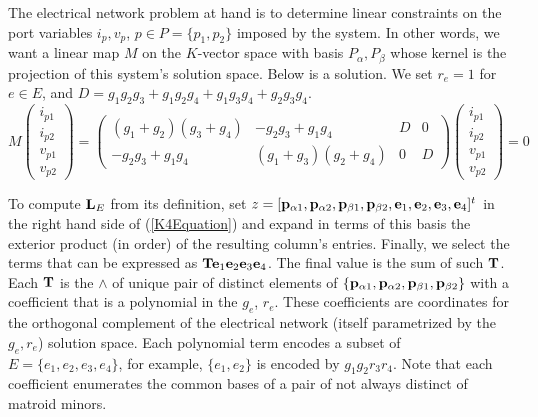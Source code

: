 The electrical network problem at hand is to determine linear constraints on the
port variables $i_p, v_p$, $p\in P = \{p_1, p_2\}$ imposed by the system.  In other words,
we want a linear map $M$ on the $K$-vector space with basis $P_\alpha, P_\beta$ whose kernel
is the projection of this system's solution space.
Below is a solution.
We set $r_e=1$ for $e\in E$, and $D=g_{1} g_{2} g_{3} + g_{1} g_{2} g_{4} + g_{1} g_{3} g_{4} + g_{2} g_{3} g_{4}$.
\begin{equation}\label{K4Soln}
M\left(\begin{array}{c} i_{p1} \\ i_{p2} \\ v_{p1} \\ v_{p2}
\end{array}\right) =
\left(\begin{array}{cccc}
{\left(g_{1} + g_{2}\right)} {\left(g_{3} + g_{4}\right)} & -g_{2} g_{3} + g_{1} g_{4} & D & 0 \\
-g_{2} g_{3} + g_{1} g_{4} & {\left(g_{1} + g_{3}\right)} {\left(g_{2} + g_{4}\right)} & 0 & D
\end{array}\right)
\left(\begin{array}{c} i_{p1} \\ i_{p2} \\ v_{p1} \\ v_{p2}
\end{array}\right) = 0
\end{equation}


To compute $\mathbf{L}_E$ from its definition, set 
$z=[\mathbf{p}_{\alpha 1},\mathbf{p}_{\alpha 2},\mathbf{p}_{\beta 1},\mathbf{p}_{\beta 2},
  \mathbf{e}_1,  \mathbf{e}_2,  \mathbf{e}_3,  \mathbf{e}_4]^t$
in the right hand side of (\ref{K4Equation}) 
and expand in terms of this basis
the exterior product (in order) of the resulting column's entries.
Finally, we select
the terms that can be expressed as $\mathbf{T}\mathbf{e}_1\mathbf{e}_2\mathbf{e}_3\mathbf{e}_4$.  The final
value is the sum of such $\mathbf{T}$.
Each $\mathbf{T}$ is the $\wedge$ of unique pair of distinct elements
of $\{\mathbf{p}_{\alpha 1}, \mathbf{p}_{\alpha 2}, \mathbf{p}_{\beta 1}, \mathbf{p}_{\beta 2}\}$
with a coefficient that is a polynomial in the 
$g_e$, $r_e$.  These coefficients are \Plucker coordinates
for the orthogonal complement of the electrical network
(itself parametrized by the $g_e, r_e$) solution space.
Each polynomial
term encodes a subset of $E=\{e_1, e_2, e_3, e_4\}$, for example, $\{e_1, e_2\}$ is encoded
by $g_1g_2r_3r_4$. Note that each coefficient enumerates
the common bases of a pair of not always distinct of matroid minors.


